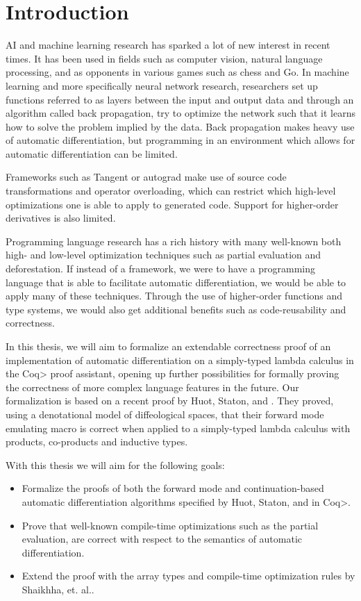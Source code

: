 \section{Introduction}

AI and machine learning research has sparked a lot of new interest in recent times. It has been used in fields such as computer vision, natural language processing, and as opponents in various games such as chess and Go.
In machine learning and more specifically neural network research, researchers set up functions referred to as layers between the input and output data and through an algorithm called back propagation, try to optimize the network such that it learns how to solve the problem implied by the data.
Back propagation makes heavy use of automatic differentiation, but programming in an environment which allows for automatic differentiation can be limited.

Frameworks such as Tangent or autograd make use of source code transformations and operator overloading, which can restrict which high-level optimizations one is able to apply to generated code. Support for higher-order derivatives is also limited.

Programming language research has a rich history with many well-known both high- and low-level optimization techniques such as partial evaluation and deforestation.
If instead of a framework, we were to have a programming language that is able to facilitate automatic differentiation, we would be able to apply many of these techniques. Through the use of higher-order functions and type systems, we would also get additional benefits such as code-reusability and correctness.

In this thesis, we will aim to formalize an extendable correctness proof of an implementation of automatic differentiation on a simply-typed lambda calculus in the \<Coq> proof assistant, opening up further possibilities for formally proving the correctness of more complex language features in the future.
Our formalization is based on a recent proof by Huot, Staton, and \Vakar{} \cite{huot2020correctness}.
They proved, using a denotational model of diffeological spaces, that their forward mode emulating macro is correct when applied to a simply-typed lambda calculus with products, co-products and inductive types.


With this thesis we will aim for the following goals:
\begin{itemize}
  \item Formalize the proofs of both the forward mode and continuation-based automatic differentiation algorithms specified by Huot, Staton, and \Vakar{} \cite{huot2020correctness} in \<Coq>.
  \item Prove that well-known compile-time optimizations such as the partial evaluation, are correct with respect to the semantics of automatic differentiation.
  \item Extend the proof with the array types and compile-time optimization rules by Shaikhha, et. al.\cite{Shaikha2019}.
\end{itemize}


